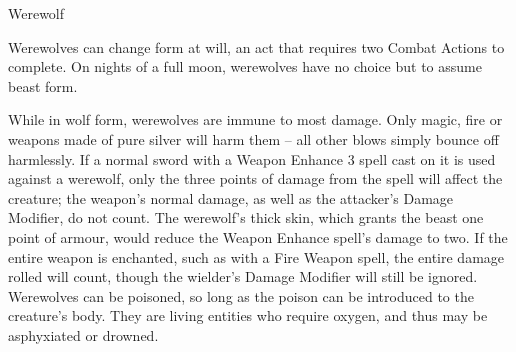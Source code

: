 \begin{monsterbox}{Werewolf}
\begin{rpg-monsteraction}
	\end{rpg-monsteraction}
	\begin{rpg-monsteraction}[Shapeshift]
		Werewolves can change form at will, an act that requires two Combat Actions to complete. On nights of a full moon, werewolves have no choice but to assume beast form.
	\end{rpg-monsteraction}
	\begin{rpg-monsteraction}
		While in wolf form, werewolves are immune to most damage. Only magic, fire or weapons made of pure silver will harm them – all other blows simply bounce off harmlessly. If a normal sword with a Weapon Enhance 3 spell cast on it is used against a werewolf, only the three points of damage from the spell will affect the creature; the weapon’s normal damage, as well as the attacker’s Damage Modifier, do not count. The werewolf’s thick skin, which grants the beast one point of armour, would reduce the Weapon Enhance spell’s damage to two. If the entire weapon is enchanted, such as with a Fire Weapon spell, the entire damage rolled will count, though the wielder’s Damage Modifier will still be ignored. Werewolves can be poisoned, so long as the poison can be introduced to the creature’s body. They are living entities who require oxygen, and thus may be asphyxiated or drowned.
	\end{rpg-monsteraction}

\end{monsterbox}

\newpage


